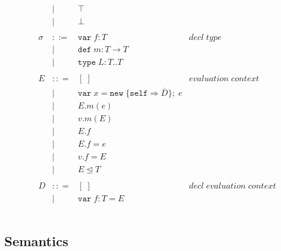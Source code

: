 \documentclass{llncs}
\begin{document}
\[\begin{array}{lll}
\begin{array}{lllr}
& | & \top & \\
& | & \bot & \\
&&\\
\sigma & ::= & \texttt{var} \; f:T & decl \; type\\
       & |   & \texttt{def} \; m:T \rightarrow T \\
		 & |   & \texttt{type} \; L : T .. T &\\
&&\\
E & :: = & [\;] & evaluation \; context \\
       & | & \texttt{var} \; x = \texttt{new} \; \{\texttt{self} \Rightarrow \overline{D}\}; \; e& \\
       & | & E.m(e)\\
       & | & v.m(E)\\
       & | & E.f\\
       & | & E.f = e\\
       & | & v.f = E\\
       & | & E \unlhd T\\
&&\\
D & :: = & [\;] & decl \; evaluation \; context \\
       & | & \texttt{var} \; f : T = E\\
&&\\
\end{array}
\end{array}
\]

\subsection{Semantics}









\end{document}
